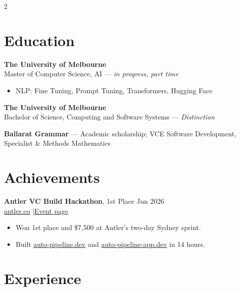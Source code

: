 \documentclass[10pt, a4paper]{article}
\begin{document}
\setlength{\columnsep}{12pt}
\begin{multicols}{2}

\section{Education}

\textbf{The University of Melbourne} \\
Master of Computer Science, AI --- \textit{in progress, part time}
\begin{itemize}
  \item NLP: Fine Tuning, Prompt Tuning, Transformers, Hugging Face
\end{itemize}

\textbf{The University of Melbourne} \\
Bachelor of Science, Computing and Software Systems --- \textit{\mbox{Distinction}}

\textbf{Ballarat Grammar} --- Academic scholarship; VCE Software Development, Specialist \& Methods Mathematics

\section{Achievements}

\textbf{Antler VC Build Hackathon}, 1st Place \hfill Jun 2026 \\
\href{https://www.antler.co/}{antler.co} \quad|\quad \href{https://luma.com/build-the-hackathon?tk=3hiTHC}{Event page}
\begin{itemize}
  \item Won 1st place and \$7,500 at Antler's two-day Sydney sprint.
  \item Built \href{https://auto-pipeline.dev/}{auto-pipeline.dev} and \href{https://auto-pipeline-app.dev/}{auto-pipeline-app.dev} in 14 hours.
\end{itemize}

\section{Experience}


\end{multicols}
\end{document}
